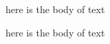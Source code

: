 \begin{myenvironment}
		here is the body of text
\end{myenvironment}

\begin{myenvironment}
		here is the body of text
\end{myenvironment}

